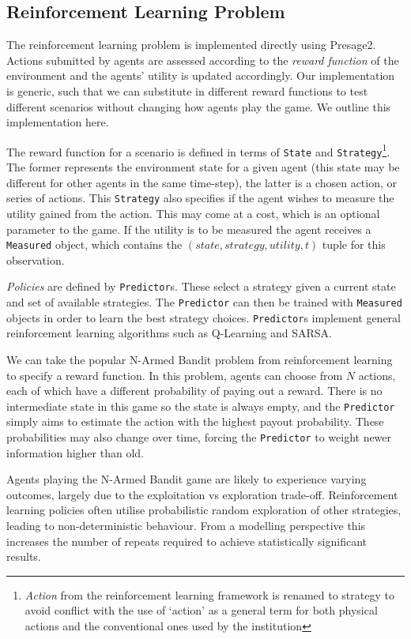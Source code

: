 \subsection{Reinforcement Learning Problem}

The reinforcement learning problem is implemented directly using Presage2.
Actions submitted by agents are assessed according to the \emph{reward
function} of the environment and the agents' utility is updated accordingly.
Our implementation is generic, such that we can substitute in different reward
functions to test different scenarios without changing how agents play the
game. We outline this implementation here.

The reward function for a scenario is defined in terms of \texttt{State} and
\texttt{Strategy}\footnote{\emph{Action} from the reinforcement learning
framework is renamed to strategy to avoid conflict with the use of `action' as
a general term for both physical actions and the conventional ones used by the
institution}. The former represents the environment state for a given agent
(this state may be different for other agents in the same time-step), the
latter is a chosen action, or series of actions. This \texttt{Strategy} also
specifies if the agent wishes to measure the utility gained from the action.
This may come at a cost, which is an optional parameter to the game. If the
utility is to be measured the agent receives a \texttt{Measured} object, which
contains the $(\mathit{state}, \mathit{strategy}, \mathit{utility}, t)$ tuple
for this observation.

\emph{Policies} are defined by \texttt{Predictor}s. These select a strategy
given a current state and set of available strategies. The \texttt{Predictor}
can then be trained with \texttt{Measured} objects in order to learn the best
strategy choices. \texttt{Predictor}s implement general reinforcement 
learning algorithms such as Q-Learning and SARSA.

We can take the popular N-Armed Bandit problem from reinforcement learning to
specify a reward function. In this problem, agents can choose from $N$
actions, each of which have a different probability of paying out a reward.
There is no intermediate state in this game so the state is always empty, and
the \texttt{Predictor} simply aims to estimate the action with the highest
payout probability. These probabilities may also change over time, forcing the
\texttt{Predictor} to weight newer information higher than old.

Agents playing the N-Armed Bandit game are likely to experience varying
outcomes, largely due to the exploitation vs exploration trade-off.
Reinforcement learning policies often utilise probabilistic random exploration
of other strategies, leading to non-deterministic behaviour. From a modelling
perspective this increases the number of repeats required to achieve
statistically significant results.

